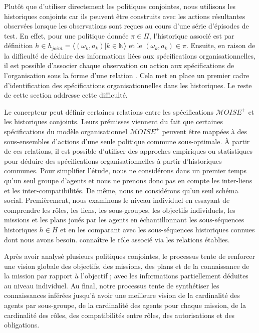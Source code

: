 \documentclass[contribution]{jfsma}
\newcounter{relation}
\begin{document}
Plutôt que d'utiliser directement les politiques conjointes, nous utilisons les historiques conjoints car ils peuvent être construits avec les actions résultantes observées lorsque les observations sont reçues au cours d'une série d'épisodes de test. En effet, pour une politique donnée $\pi \in \Pi$, l'historique associé est par définition $h \in h_{joint} = \langle(\omega_k,a_k) | k \in \mathbb{N}\rangle$ et le $(\omega_k,a_k) \in \pi$.
Ensuite, en raison de la difficulté de déduire des informations liées aux spécifications organisationnelles, il est possible d'associer chaque observation ou action aux spécifications de l'organisation sous la forme d'une relation . Cela met en place un premier cadre d’identification des spécifications organisationnelles dans les historiques. Le reste de cette section addresse cette difficulté.

Le concepteur peut définir certaines relations entre les spécifications $\mathcal{M}OISE^+$ et les historiques conjoints. Leurs prémisses viennent du fait que certaines spécifications du modèle organisationnel $\mathcal{M}OISE^+$ peuvent être mappées à des sous-ensembles d'actions d'une seule politique commune sous-optimale.
À partir de ces relations, il est possible d’utiliser des approches empiriques ou statistiques pour déduire des spécifications organisationnelles à partir d’historiques communes.
Pour simplifier l'étude, nous ne considérons dans un premier temps qu'un seul groupe d'agents et nous ne prenons donc pas en compte les inter-liens et les inter-compatibilités. De même, nous ne considérons qu’un seul schéma social.
Premièrement, nous examinons le niveau individuel en essayant de comprendre les rôles, les liens, les sous-groupes, les objectifs individuels, les missions et les plans joués par les agents en échantillonnant les sous-séquences historiques $h \in H$ et en les comparant avec les sous-séquences historiques connues dont nous avons besoin. connaître le rôle associé via les relations établies.

Après avoir analysé plusieurs politiques conjointes, le processus tente de renforcer une vision globale des objectifs, des missions, des plans et de la connaissance de la mission par rapport à l'objectif ; avec les informations partiellement déduites au niveau individuel.
Au final, notre processus tente de synthétiser les connaissances inférées jusqu'à avoir une meilleure vision de la cardinalité des agents par sous-groupe, de la cardinalité des agents pour chaque mission, de la cardinalité des rôles, des compatibilités entre rôles, des autorisations et des obligations.
\end{document}
